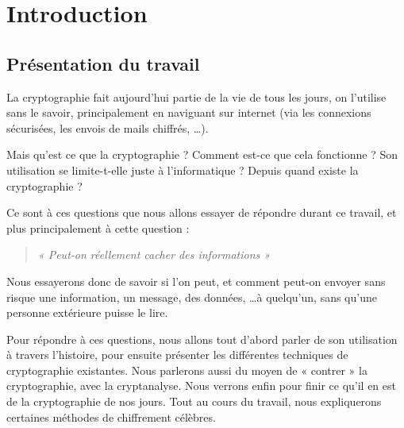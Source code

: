 \chapter{Introduction}

\section{Présentation du travail}
La cryptographie fait aujourd'hui partie de la vie de tous les jours,
on l'utilise sans le savoir, principalement en naviguant sur internet
(via les connexions sécurisées, les envois de mails chiffrés, \dots).

Mais qu'est ce que la cryptographie ? Comment est-ce que cela
fonctionne ? Son utilisation se limite-t-elle juste à l'informatique ?
Depuis quand existe la cryptographie ?

Ce sont à ces questions que nous allons essayer de répondre durant ce
travail, et plus principalement à cette question :

\begin{quote}
\emph{« Peut-on réellement cacher des informations »}
\end{quote}

Nous essayerons donc de savoir si l'on peut, et comment peut-on
envoyer sans risque une information, un message, des données, \dots à
quelqu'un, sans qu'une personne extérieure puisse le lire.

Pour répondre à ces questions, nous allons tout d'abord parler de son
utilisation à travers l'histoire, pour ensuite présenter les
différentes techniques de cryptographie existantes. Nous parlerons
aussi du moyen de « contrer » la cryptographie, avec la
cryptanalyse. Nous verrons enfin pour finir ce qu'il en est de la
cryptographie de nos jours. Tout au cours du travail, nous
expliquerons certaines méthodes de chiffrement célèbres.


